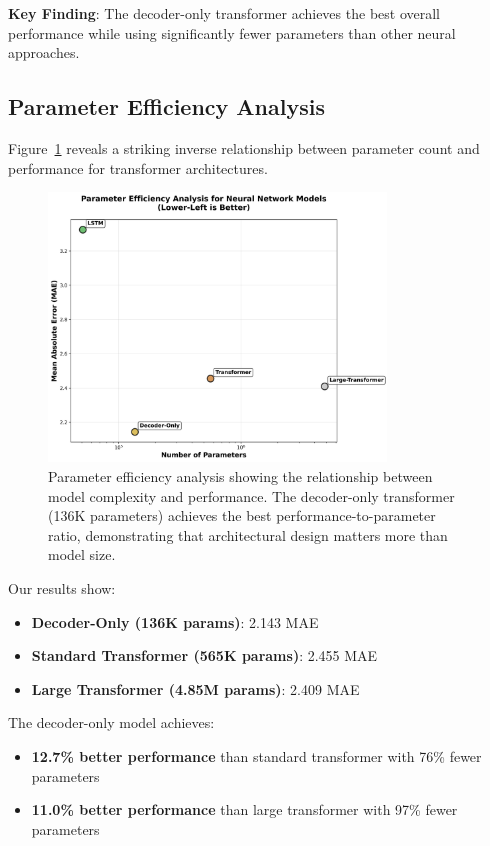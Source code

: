\documentclass[11pt]{article}
\begin{document}
\textbf{Key Finding}: The decoder-only transformer achieves the best overall performance while using significantly fewer parameters than other neural approaches.

\subsection{Parameter Efficiency Analysis}

Figure~\ref{fig:param_efficiency} reveals a striking inverse relationship between parameter count and performance for transformer architectures.

\begin{figure}[h]
\centering
\includegraphics[width=0.8\textwidth]{results/figure2_parameter_efficiency.png}
\caption{Parameter efficiency analysis showing the relationship between model complexity and performance. The decoder-only transformer (136K parameters) achieves the best performance-to-parameter ratio, demonstrating that architectural design matters more than model size.}
\label{fig:param_efficiency}
\end{figure}

Our results show:
\begin{itemize}
\item \textbf{Decoder-Only (136K params)}: 2.143 MAE
\item \textbf{Standard Transformer (565K params)}: 2.455 MAE  
\item \textbf{Large Transformer (4.85M params)}: 2.409 MAE
\end{itemize}

The decoder-only model achieves:
\begin{itemize}
\item \textbf{12.7\% better performance} than standard transformer with 76\% fewer parameters
\item \textbf{11.0\% better performance} than large transformer with 97\% fewer parameters
\end{itemize}
\end{document}
